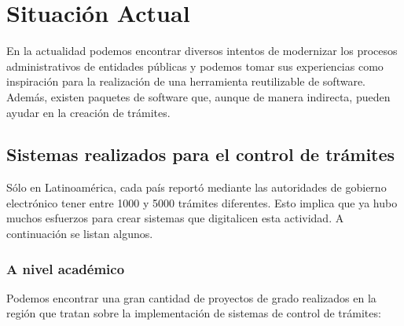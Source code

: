 \section{Situación Actual}

En la actualidad podemos encontrar diversos intentos de modernizar los procesos administrativos de entidades públicas y podemos tomar sus experiencias como inspiración para la realización de una herramienta reutilizable de software. Además, existen paquetes de software que, aunque de manera indirecta, pueden ayudar en la creación de trámites.

\subsection{Sistemas realizados para el control de trámites}

Sólo en Latinoamérica, cada país reportó mediante las autoridades de gobierno electrónico tener entre 1000 y 5000 trámites diferentes. Esto implica que ya hubo muchos esfuerzos para crear sistemas que digitalicen esta actividad. A continuación se listan algunos.

\subsubsection{A nivel académico}

Podemos encontrar una gran cantidad de proyectos de grado realizados en la región que tratan sobre la implementación de sistemas de control de trámites:

